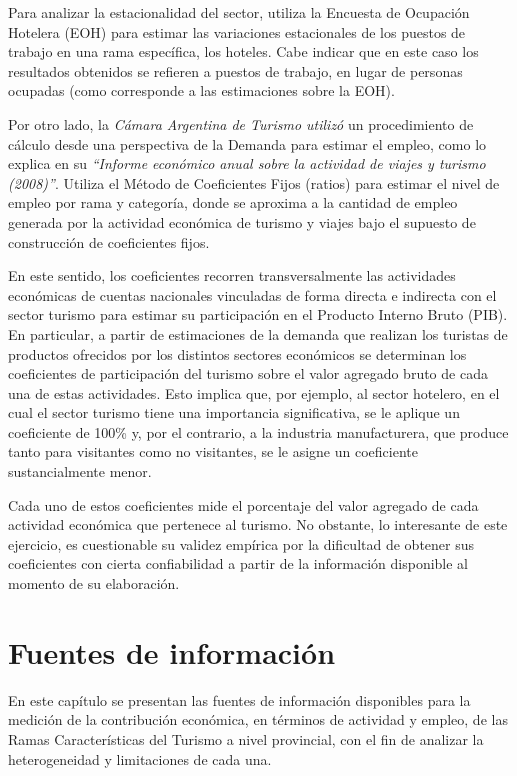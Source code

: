 \documentclass[
  openany]{book}
\begin{document}
Para analizar la estacionalidad del sector, utiliza la Encuesta de Ocupación Hotelera (EOH) para estimar las variaciones estacionales de los puestos de trabajo en una rama específica, los hoteles. Cabe indicar que en este caso los resultados obtenidos se refieren a puestos de trabajo, en lugar de personas ocupadas (como corresponde a las estimaciones sobre la EOH).

Por otro lado, la \emph{Cámara Argentina de Turismo utilizó} un procedimiento de cálculo desde una perspectiva de la Demanda para estimar el empleo, como lo explica en su \emph{``Informe económico anual sobre la actividad de viajes y turismo (2008)''}. Utiliza el Método de Coeficientes Fijos (ratios) para estimar el nivel de empleo por rama y categoría, donde se aproxima a la cantidad de empleo generada por la actividad económica de turismo y viajes bajo el supuesto de construcción de coeficientes fijos.

En este sentido, los coeficientes recorren transversalmente las actividades económicas de cuentas nacionales vinculadas de forma directa e indirecta con el sector turismo para estimar su participación en el Producto Interno Bruto (PIB). En particular, a partir de estimaciones de la demanda que realizan los turistas de productos ofrecidos por los distintos sectores económicos se determinan los coeficientes de participación del turismo sobre el valor agregado bruto de cada una de estas actividades. Esto implica que, por ejemplo, al sector hotelero, en el cual el sector turismo tiene una importancia significativa, se le aplique un coeficiente de 100\% y, por el contrario, a la industria manufacturera, que produce tanto para visitantes como no visitantes, se le asigne un coeficiente sustancialmente menor.

Cada uno de estos coeficientes mide el porcentaje del valor agregado de cada actividad económica que pertenece al turismo. No obstante, lo interesante de este ejercicio, es cuestionable su validez empírica por la dificultad de obtener sus coeficientes con cierta confiabilidad a partir de la información disponible al momento de su elaboración.

\hypertarget{fuentes-informacion}{%
\chapter{\texorpdfstring{\textbf{Fuentes de información}}{Fuentes de información}}\label{fuentes-informacion}}

En este capítulo se presentan las fuentes de información disponibles para la medición de la contribución económica, en términos de actividad y empleo, de las Ramas Características del Turismo a nivel provincial, con el fin de analizar la heterogeneidad y limitaciones de cada una.
\end{document}
